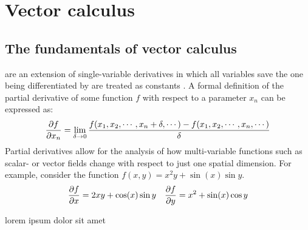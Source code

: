 \section{Vector calculus}
\subsection{The fundamentals of vector calculus}

\begin{defn}
	 are an extension of single-variable derivatives in which all variables save
	the one being differentiated by are treated as constants \cite{MORTIMER201389}. A formal definition of the
	partial derivative of some function $f$ with respect to a parameter $x_n$ can be expressed as:
	\begin{equation}
		\pdv{f}{x_n}=\lim_{\delta\rightarrow0}\frac{f(x_1,x_2,\cdots,x_n+\delta,\cdots)-f(x_1,x_2,\cdots,x_n,\cdots)}{\delta}
	\end{equation}
	Partial derivatives allow for the analysis of how multi-variable functions such as scalar- or vector fields change
	with respect to just one spatial dimension. For example, consider the function $f(x,y)=x^2y+\sin(x)\sin y$.
	\begin{align*}
		\pdv{f}{x}=2xy+\cos(x)\sin y&&\pdv{f}{y}=x^2+\sin(x)\cos y
	\end{align*}
\end{defn}

lorem ipsum dolor sit amet